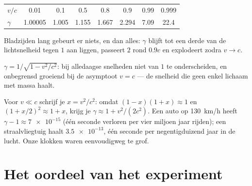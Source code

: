 \begin{example}\label{ex:g12:special-relativity:gammatable}
\begin{center}\small
\begin{tabular}{lccccccc}
$v/c$    & 0.01     & 0.1   & 0.5   & 0.8   & 0.9   & 0.99 & 0.999\\
$\gamma$ & 1.00005 & 1.005 & 1.155 & 1.667 & 2.294 & 7.09 & 22.4
\end{tabular}
\end{center}
Bladzijden lang gebeurt er niets, en dan alles: $\gamma$ blijft tot een derde
van de lichtsnelheid tegen $1$ aan liggen, passeert $2$ rond $0.9c$ en explodeert
zodra $v \to c$.
\end{example}

\begin{omfigure}

{\small $\gamma = 1/\sqrt{1 - v^2/c^2}$: bij alledaagse snelheden niet van $1$
te onderscheiden, en onbegrensd groeiend bij de asymptoot $v = c$ --- de
snelheid die geen enkel lichaam met massa haalt.}
\end{omfigure}

\begin{remark}\label{rem:g12:special-relativity:everyday}
Voor $v \ll c$ schrijf je $x = v^2/c^2$: omdat $(1-x)(1+x) \approx 1$ en
$(1 + x/2)^2 \approx 1 + x$, krijg je $\gamma \approx 1 + v^2/(2c^2)$. Een auto
op \qty{130}{km/h} heeft $\gamma - 1 \approx \num{7e-15}$ (één seconde verloren
per vier miljoen jaar rijden); een straalvliegtuig haalt $\num{3.5e-13}$, één
seconde per negentigduizend jaar in de lucht. Onze klokken waren eenvoudigweg te
grof.
\end{remark}

\section{Het oordeel van het experiment}

